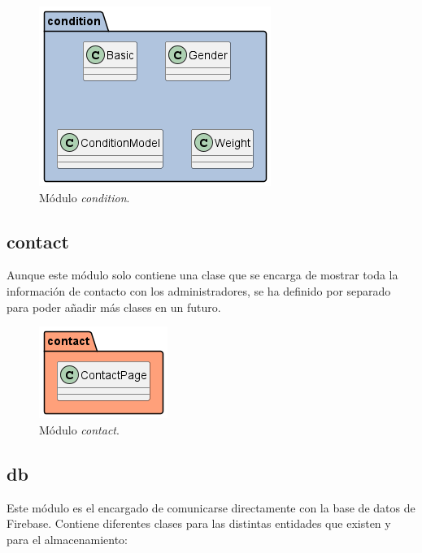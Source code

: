 \documentclass[a4paper, 12pt]{article}
\begin{document}
\begin{figure}[H]
	\begin{center}
		{\includegraphics[]{diagram/Condition.png}\par}
		\caption{Módulo \textit{condition}.}
	\end{center}
\end{figure}

\subsection*{contact}

Aunque este módulo solo contiene una clase que se encarga de mostrar toda la información de contacto con los administradores, se ha definido por separado para poder añadir más clases en un futuro.

\begin{figure}[H]
	\begin{center}
		{\includegraphics[]{diagram/Contact.png}\par}
		\caption{Módulo \textit{contact}.}
	\end{center}
\end{figure}


\subsection*{db}

Este módulo es el encargado de comunicarse directamente con la base de datos de Firebase. Contiene diferentes clases para las distintas entidades que existen y para el almacenamiento:
\end{document}
